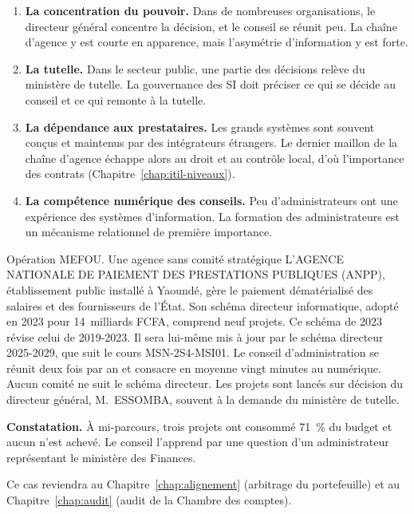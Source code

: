 \begin{enumerate}
    \item \textbf{La concentration du pouvoir.} Dans de nombreuses
          organisations, le directeur général concentre la décision, et le
          conseil se réunit peu. La chaîne d'agence y est courte en
          apparence, mais l'asymétrie d'information y est forte.
    \item \textbf{La tutelle.} Dans le secteur public, une partie des
          décisions relève du ministère de tutelle. La gouvernance des SI
          doit préciser ce qui se décide au conseil et ce qui remonte à la
          tutelle.
    \item \textbf{La dépendance aux prestataires.} Les grands systèmes sont
          souvent conçus et maintenus par des intégrateurs étrangers. Le
          dernier maillon de la chaîne d'agence échappe alors au droit et
          au contrôle local, d'où l'importance des contrats
          (Chapitre~\ref{chap:itil-niveaux}).
    \item \textbf{La compétence numérique des conseils.} Peu
          d'administrateurs ont une expérience des systèmes d'information.
          La formation des administrateurs est un mécanisme relationnel de
          première importance.
\end{enumerate}

\begin{boxscenario}{Opération MEFOU. Une agence sans comité stratégique}
L'AGENCE NATIONALE DE PAIEMENT DES PRESTATIONS PUBLIQUES (ANPP), établissement public
installé à Yaoundé, gère le paiement dématérialisé des salaires et des
fournisseurs de l'État. Son schéma directeur informatique, adopté en 2023
pour 14~milliards FCFA, comprend neuf projets. Ce schéma de 2023 révise celui de 2019-2023. Il sera lui-même mis à jour par le schéma directeur 2025-2029, que suit le cours MSN-2S4-MSI01. Le conseil d'administration
se réunit deux fois par an et consacre en moyenne vingt minutes au
numérique. Aucun comité ne suit le schéma directeur. Les projets sont
lancés sur décision du directeur général, M.~ESSOMBA, souvent à la demande
du ministère de tutelle.

\medskip
\textbf{Constatation.} À mi-parcours, trois projets ont consommé 71~\% du
budget et aucun n'est achevé. Le conseil l'apprend par une question d'un
administrateur représentant le ministère des Finances.

\medskip
Ce cas reviendra au Chapitre~\ref{chap:alignement} (arbitrage du
portefeuille) et au Chapitre~\ref{chap:audit} (audit de la Chambre des
comptes).
\end{boxscenario}

